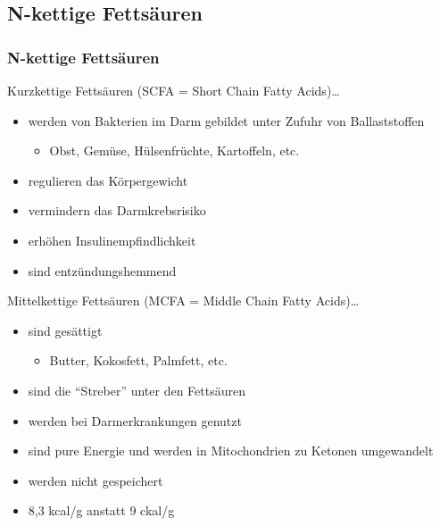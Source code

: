 \documentclass[xcolor=dvipsnames]{beamer}
\begin{document}
    \subsection{N-kettige Fettsäuren}
    \begin{frame}[allowframebreaks]
        \frametitle{N-kettige Fettsäuren}

        \begin{block}{Kurzkettige Fettsäuren (SCFA = Short Chain Fatty Acids)\ldots}
            \begin{itemize}
                \setlength\itemsep{1em}
                \item werden von Bakterien im Darm gebildet unter Zufuhr von Ballaststoffen
                \begin{itemize}
                    \item Obst, Gemüse, Hülsenfrüchte, Kartoffeln, etc.
                \end{itemize}
                \item regulieren das Körpergewicht
                \item vermindern das Darmkrebsrisiko
                \item erhöhen Insulinempfindlichkeit
                \item sind entzündungshemmend
            \end{itemize}
        \end{block}

        \framebreak

        \begin{block}{Mittelkettige Fettsäuren (MCFA = Middle Chain Fatty Acids)\ldots}
            \begin{itemize}
                \setlength\itemsep{1em}
                \item sind gesättigt
                \begin{itemize}
                    \item Butter, Kokosfett, Palmfett, etc.
                \end{itemize}
                \item sind die "`Streber"' unter den Fettsäuren
                \item werden bei Darmerkrankungen genutzt
                \item sind pure Energie und werden in Mitochondrien zu Ketonen umgewandelt
                \item werden nicht gespeichert
                \item 8,3 kcal/g anstatt 9 ckal/g
            \end{itemize}
        \end{block}


\end{frame}
\end{document}
